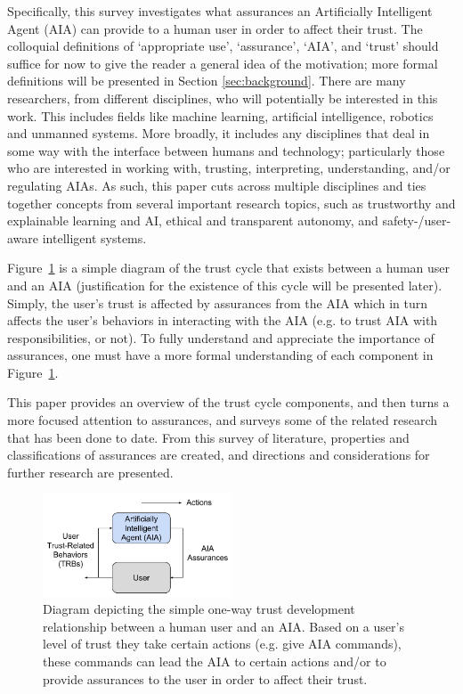     Specifically, this survey investigates what assurances an Artificially Intelligent Agent (AIA) can provide to a human user in order to affect their trust. The colloquial definitions of `appropriate use', `assurance', `AIA', and `trust' should suffice for now to give the reader a general idea of the motivation; more formal definitions will be presented in Section \ref{sec:background}. There are many researchers, from different disciplines, who will potentially be interested in this work. This includes fields like machine learning, artificial intelligence, robotics and unmanned systems. More broadly, it includes any disciplines that deal in some way with the interface between humans and technology; particularly those who are interested in working with, trusting, interpreting, understanding, and/or regulating AIAs. As such, this paper cuts across multiple disciplines and ties together concepts from several important research topics, such as trustworthy and explainable learning and AI, ethical and transparent autonomy, and safety-/user-aware intelligent systems.

    Figure~\ref{fig:SimpleTrust_one_way} is a simple diagram of the trust cycle that exists between a human user and an AIA (justification for the existence of this cycle will be presented later). Simply, the user's trust is affected by assurances from the AIA which in turn affects the user's behaviors in interacting with the AIA (e.g. to trust AIA with responsibilities, or not). To fully understand and appreciate the importance of assurances, one must have a more formal understanding of each component in Figure~\ref{fig:SimpleTrust_one_way}.

    This paper provides an overview of the trust cycle components, and then turns a more focused attention to assurances, and surveys some of the related research that has been done to date. From this survey of literature, properties and classifications of assurances are created, and directions and considerations for further research are presented.

    \begin{figure}
        \centering
        \includegraphics[width=0.5\textwidth]{Figures/SimpleTrust_one_way}
        \caption{Diagram depicting the simple one-way trust development relationship between a human user and an AIA. Based on a user's level of trust they take certain actions (e.g. give AIA commands), these commands can lead the AIA to certain actions and/or to provide assurances to the user in order to affect their trust.}
        \label{fig:SimpleTrust_one_way}
    \end{figure}

